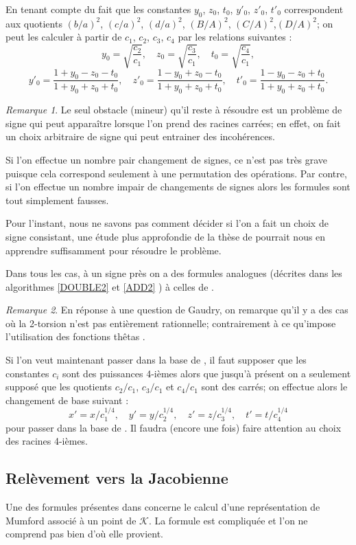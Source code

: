 \documentclass[a4paper,12pt]{article}
\theoremstyle{definition}
\theoremstyle{remark}
\newtheorem{remarque}{Remarque}
\numberwithin{equation}{section}
\begin{document}
En tenant compte du fait que les constantes $y_0$, $z_0$, $t_0$, $y'_0$, $z'_0$, $t'_0$ correspondent aux quotients $(b/a)^2$, $(c/a)^2$, $(d/a)^2$, $(B/A)^2$, $(C/A)^2$,$(D/A)^2$; on peut les calculer à partir de $c_1$, $c_2$, $c_3$, $c_4$ par les relations suivantes :
$$y_0 = \sqrt{\frac{c_2}{c_1}}, \quad z_0 = \sqrt{\frac{c_3}{c_1}}, \quad t_0 = \sqrt{\frac{c_4}{c_1}},$$
$$y'_0 = \frac{1+y_0-z_0-t_0}{1+y_0+z_0+t_0}, \quad z'_0 = \frac{1-y_0+z_0-t_0}{1+y_0+z_0+t_0}, \quad
t'_0 = \frac{1-y_0-z_0+t_0}{1+y_0+z_0+t_0}.$$

\begin{remarque}
Le seul obstacle (mineur) qu'il reste à résoudre est un problème de signe qui peut apparaître lorsque l'on prend des racines carrées; en effet, on fait un choix arbitraire de signe qui peut entrainer des incohérences.

Si l'on effectue un nombre pair changement de signes, ce n'est pas très grave puisque cela correspond seulement à une permutation des opérations. Par contre, si l'on effectue un nombre impair de changements de signes alors les formules sont tout simplement fausses.

Pour l'instant, nous ne savons pas comment décider si l'on a fait un choix de signe consistant, une étude plus approfondie de la thèse de \citet{cosset} pourrait nous en apprendre suffisamment pour résoudre le problème.
\end{remarque}

Dans tous les cas, à un signe près on a des formules analogues (décrites dans les algorithmes \ref{DOUBLE2} et \ref{ADD2} ) à celles de \citep{gaudry}.

\begin{remarque}
En réponse à une question de Gaudry, on remarque qu'il y a des cas où la 2-torsion n'est pas entièrement rationnelle; contrairement à ce qu'impose l'utilisation des fonctions thêtas \citep{gaudry}.
\end{remarque}

Si l'on veut maintenant passer dans la base de \citet{gaudry}, il faut supposer que les constantes $c_i$ sont des puissances 4-ièmes alors que jusqu'à présent on a seulement supposé que les quotients $c_2/c_1$, $c_3/c_1$ et $c_4/c_1$ sont des carrés; on effectue alors le changement de base suivant :
$$x'=x/c_1^{1/4}, \quad y'=y/c_2^{1/4}, \quad z'=z/c_3^{1/4}, \quad t'=t/c_4^{1/4}$$
pour passer dans la base de \citet{gaudry}. Il faudra (encore une fois) faire attention au choix des racines 4-ièmes.

\subsection{Relèvement vers la Jacobienne}
Une des formules présentes dans \citep{gaudry} concerne le calcul d'une représentation de Mumford associé à un point de $\mathcal{K}$. La formule est compliquée et l'on ne comprend pas bien d'où elle provient.
\end{document}
